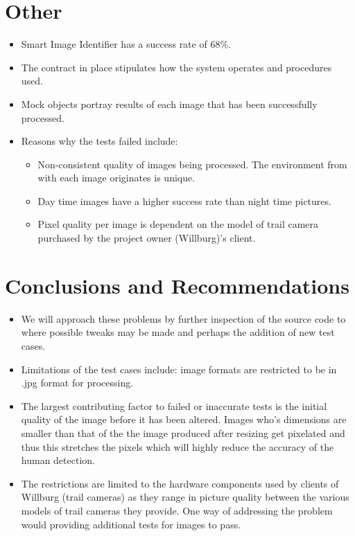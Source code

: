 \documentclass[a4paper,12pt]{report}
\begin{document}
	\section{Other}
		\begin {itemize}
			\item Smart Image Identifier has a success rate of 68\%.
			\item The contract in place stipulates how the system operates and procedures used. 
			\item Mock objects portray results of each image that has been successfully processed.
			\item Reasons why the tests failed include:
			\begin{itemize}
				\item Non-consistent quality of images being processed. The environment from with each image originates is unique.
				\item Day time images have a higher success rate than night time pictures.
				\item Pixel quality per image is dependent on the model of trail camera purchased by the project owner (Willburg)'s client.
			\end{itemize}
		\end {itemize}
		
	\section{Conclusions and Recommendations}
		\begin {itemize}
			\item We will approach these problems by further inspection of the source code to where possible tweaks may be made and perhaps the addition of new test cases.
			\item Limitations of the test cases include: image formats are restricted to be in .jpg format for processing.
			\item The largest contributing factor to failed or inaccurate tests is the initial quality of the image before it has been altered. Images who's dimensions are smaller than that of the the image produced after resizing get pixelated and thus this stretches the pixels which will highly reduce the accuracy of the human detection.			
			\item The restrictions are limited to the hardware components used by clients of Willburg (trail cameras) as they range in picture quality between the various models of trail cameras they provide. One way of addressing the problem would providing additional tests for images to pass.
		\end {itemize}
\end{document}
